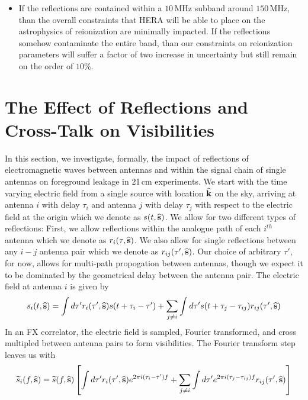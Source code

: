 \documentclass[twocolumn]{emulateapj}
\begin{document}
\begin{itemize}
\item If the reflections are contained within a $10$\,MHz subband around $150$\,MHz, than the overall constraints that HERA will be able to place on the astrophysics of reionization are minimally impacted. If the reflections somehow contaminate the entire band, than our constraints on reionization parameters will suffer a factor of two increase in uncertainty but still remain on the order of $10$\%. 
\end{itemize}

\label{sec:Conclusion}



\appendix
\section{The Effect of Reflections and Cross-Talk on Visibilities}\label{app:Reflections}
In this section, we investigate, formally, the impact of reflections of electromagnetic waves between antennas and within the signal chain of single antennas on foreground leakage in 21\,cm experiments. We start with the time varying electric field from a single source with location ${\bf \widehat{k}}$ on the sky, arriving at antenna $i$ with delay $\tau_i$ and antenna $j$ with delay $\tau_j$ with respect to the electric field at the origin which we denote as $s(t,{\bf \widehat{s}})$. We allow for two different types of reflections: First, we allow reflections within the analogue path of each $i^{th}$ antenna which we denote as $r_i(\tau,{\bf \widehat{s}})$. We also allow for single reflections between any $i-j$ antenna pair which we denote as $r_{ij}(\tau',{\bf \widehat{s}})$. Our choice of arbitrary $\tau'$, for now, allows for multi-path propogation between antennas, though we expect it to be dominated by the geometrical delay between the antenna pair. The electric field at antenna $i$ is given by
\begin{equation}
s_i(t,{\bf \widehat{s}}) = \int d \tau' r_i(\tau',{\bf \widehat{s}})s(t+\tau_i-\tau') + \sum_{j \ne i} \int d \tau' s(t + \tau_j - \tau_{ij}) r_{ij}(\tau',{\bf \widehat{s}})
\end{equation}  
In an FX correlator, the electric field is sampled, Fourier transformed, and cross multipled between antenna pairs to form visibilities. The Fourier transform step leaves us with 
\begin{equation}
\widetilde{s}_i(f,{\bf \widehat{s}}) = \widetilde{s}(f,{\bf \widehat{s}}) \left[ \int d \tau' r_i(\tau',{\bf \widehat{s}})e^{2 \pi i(\tau_i - \tau')f} + \sum_{j\ne i} \int d \tau' e^{2 \pi i(\tau_j - \tau_{ij})f} r_{ij}(\tau',{\bf \widehat{s}}) \right]
\end{equation}
\end{document}

